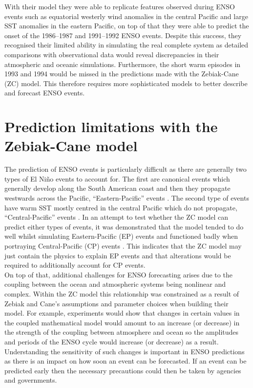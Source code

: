 \documentclass[12pt, onecolumn]{revtex4}    %
\begin{document}
With their model they were able to replicate features observed during ENSO events such as equatorial westerly wind anomalies in the central Pacific and large SST anomalies in the eastern Pacific, on top of that they were able to predict the onset of the 1986--1987 and 1991--1992 ENSO events. Despite this success, they recognised their limited ability in simulating the real complete system as detailed comparisons with observational data would reveal discrepancies in their atmospheric and oceanic simulations. Furthermore, the short warm episodes in 1993 and 1994 would be missed in the predictions made with the Zebiak-Cane (ZC) model. This therefore requires more sophisticated models to better describe and forecast ENSO events.

\section{Prediction limitations with the Zebiak-Cane model}

The prediction of ENSO events is particularly difficult as there are generally two types of El Ni\~{n}o events to account for. The first are canonical events which generally develop along the South American coast and then they propagate westwards across the Pacific, ``Eastern-Pacific'' events \citep{rasmusson1982variations}. The second type of events have warm SST mostly centred in the central Pacific which do not propagate, ``Central-Pacific'' events \citep{ashok2007nino}. In an attempt to test whether the ZC model can predict either types of events, it was demonstrated that the model tended to do well whilst simulating Eastern-Pacific (EP) events and functioned badly when portraying Central-Pacific (CP) events \citep{duan2013behaviors}. This indicates that the ZC model may just contain the physics to explain EP events and that alterations would be required to additionally account for CP events. \\

On top of that, additional challenges for ENSO forecasting arises due to the coupling between the ocean and atmospheric systems being nonlinear and complex. Within the ZC model this relationship was constrained as a result of Zebiak and Cane's assumptions and parameter choices when building their model. For example, experiments would show that changes in certain values in the coupled mathematical model would amount to an increase (or decrease) in the strength of the coupling between atmosphere and ocean so the amplitudes and periods of the ENSO cycle would increase (or decrease) as a result. Understanding the sensitivity of such changes is important in ENSO predictions as there is an impact on how soon an event can be forecasted. If an event can be predicted early then the necessary precautions could then be taken by agencies and governments. \\
\end{document}
